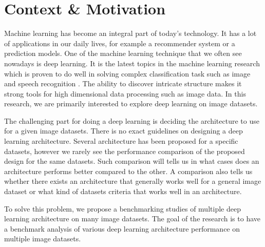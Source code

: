 \section{Context \& Motivation}
Machine learning has become an integral part of today's technology. It has a lot of applications in our daily lives, for example a recommender system or a prediction models. One of the machine learning technique that we often see nowadays is deep learning. It is the latest topics in the machine learning research which is proven to do well in solving complex classification task such as image and speech recognition \cite{krizhevsky2012imagenet}. The ability to discover intricate structure makes it strong tools for high dimensional data processing such as image data. In this research, we are primarily interested to explore deep learning on image datasets.

The challenging part for doing a deep learning is deciding the architecture to use for a given image datasets. There is no exact guidelines on designing a deep learning architecture. Several architecture has been proposed for a specific datasets, however we rarely see the performance comparison of the proposed design for the same datasets. Such comparison will tells us in what cases does an architecture performs better compared to the other. A comparison also tells us whether there exists an architecture that generally works well for a general image dataset or what kind of datasets criteria that works well in an architecture.

To solve this problem, we propose a benchmarking studies of multiple deep learning architecture on many image datasets. The goal of the research is to have a benchmark analysis of various deep learning architecture performance on multiple image datasets.   \\





